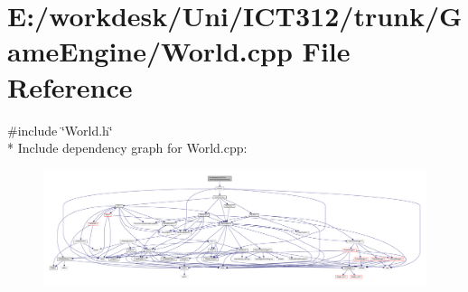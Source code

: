 \section{E\+:/workdesk/\+Uni/\+I\+C\+T312/trunk/\+Game\+Engine/\+World.cpp File Reference}
\label{_world_8cpp}
{\ttfamily \#include \char`\"{}World.\+h\char`\"{}}\\*
Include dependency graph for World.\+cpp\+:
\nopagebreak
\begin{figure}[H]
\begin{center}
\leavevmode
\includegraphics[width=350pt]{d4/dd1/_world_8cpp__incl}
\end{center}
\end{figure}
